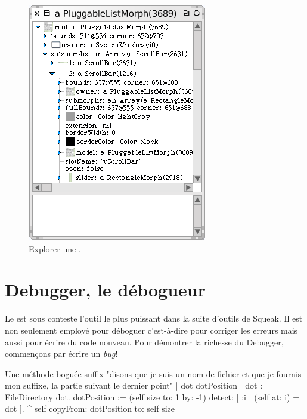 \documentclass[a4paper,10pt,twoside]{book}
\begin{document}
\begin{figure}[tbp]
	\begin{center}
		\includegraphics[scale=0.7]{explorePluggableListMorph}
	\end{center}
	\caption{Explorer une .}
	\label{fig:explorePluggableListMorph}
\end{figure}

\section{Debugger, le d\'ebogueur}
\label{sec:debugger} %

Le   est sous conteste l'outil le plus
puissant dans la suite d'outils de Squeak. 
Il est non seulement employ\'e pour d\'eboguer c'est-à-dire pour corriger les erreurs
mais aussi pour \'ecrire du code nouveau.
Pour d\'emontrer la richesse du Debugger, commen\c{c}ons par
\'ecrire un \emph{bug}!


\needspace{10ex}
\begin{method}[buggy]{Une m\'ethode bogu\'ee}
suffix
	"disons que je suis un nom de fichier et que je fournis mon suffixe, la partie suivant le dernier point"
	| dot dotPosition |
	dot := FileDirectory dot.
	dotPosition := (self size to: 1 by: -1) detect: [ :i | (self at: i) = dot ].
	^ self copyFrom: dotPosition to: self size 
\end{method}
\end{document}
